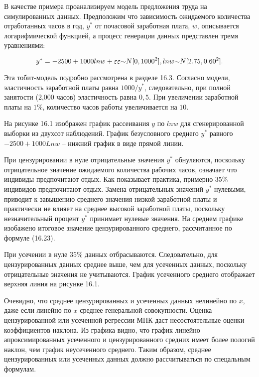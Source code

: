 В качестве примера проанализируем модель предложения труда на симулированных данных. Предположим что зависимость ожидаемого количества отработанных часов в год, $y^{*}$ от почасовой заработная плата, $w$, описывается логарифмической функцией, а процесс генерации данных представлен тремя уравнениями:

\begin{equation}
y^{*}=-2500+1000ln{w}+\varepsilon\\
\varepsilon{\sim}N[0,1000^2],\\
ln{w}{\sim}N[2.75,0.60^2].
\end{equation}


Эта тобит-модель подробно рассмотрена в разделе 16.3. Согласно модели, эластичность заработной платы равна $1000/y^{*}$, следовательно, при полной занятости (2,000 часов) эластичность равна $0,5$. При увеличении заработной платы на $1\%$, количество часов работы увеличивается на $10$.

На рисунке 16.1 изображен график рассеивания $y$ по $ln{w}$ для сгенерированной выборки из двухсот наблюдений. График безусловного среднего $y^{*}$ равного $-2500+1000 Ln{w}$ -- нижний график в виде прямой линии.

При цензурировании в нуле отрицательные значения $y^{*}$ обнуляются, поскольку отрицательное значение ожидаемого количества рабочих часов, означает что индивиды предпочитают отдых. Как показывает практика, примерно $35\%$ индивидов предпочитают отдых. Замена отрицательных значений $y^{*}$ нулевыми, приводит к завышению среднего значения низкой заработной платы и практически не влияет на среднее высокой заработной платы, поскольку незначительный процент $y^{*}$ принимает нулевые значения. На среднем графике изобажено итоговое значение цензурированного среднего, рассчитанное по формуле (16.23).


При усечении в нуле $35\%$ данных отбрасываются. Следовательно, для цензурированных данных среднее выше, чем для усеченных данных, поскольку отрицательные значения не учитываются. График усеченного среднего отображает верхняя линия на рисунке 16.1.

Очевидно, что среднее цензурированных и усеченных данных нелинейно по $x$, даже если линейно по $x$ среднее генеральной совокупности. Оценка цензурированной или усеченной регрессии МНК даст несостоятельные оценки коэффициентов наклона. Из графика видно, что график линейно апроксимированных усеченного и цензурированного средних имеет более пологий наклон, чем график неусеченного среднего. Таким образом, среднее цензурированных или усеченных данных должно рассчитываться по спецальным формулам. 


